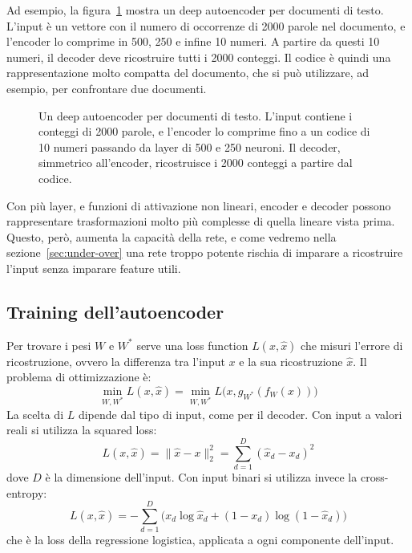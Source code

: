 Ad esempio, la figura~\ref{fig:deep-autoencoder} mostra un deep autoencoder per documenti di testo. L'input è un vettore con il numero di occorrenze di 2000 parole nel documento, e l'encoder lo comprime in 500, 250 e infine 10 numeri. A partire da questi 10 numeri, il decoder deve ricostruire tutti i 2000 conteggi. Il codice è quindi una rappresentazione molto compatta del documento, che si può utilizzare, ad esempio, per confrontare due documenti.

\begin{figure}[htbp]
\centering
{}
\caption{Un deep autoencoder per documenti di testo. L'input contiene i conteggi di 2000 parole, e l'encoder lo comprime fino a un codice di 10 numeri passando da layer di 500 e 250 neuroni. Il decoder, simmetrico all'encoder, ricostruisce i 2000 conteggi a partire dal codice.}
\label{fig:deep-autoencoder}
\end{figure}

Con più layer, e funzioni di attivazione non lineari, encoder e decoder possono rappresentare trasformazioni molto più complesse di quella lineare vista prima. Questo, però, aumenta la capacità della rete, e come vedremo nella sezione~\ref{sec:under-over} una rete troppo potente rischia di imparare a ricostruire l'input senza imparare feature utili.

\subsection{Training dell'autoencoder}\label{sec:autoencoder-training}
Per trovare i pesi $W$ e $W^*$ serve una loss function $L(x, \hat{x})$ che misuri l'errore di ricostruzione, ovvero la differenza tra l'input $x$ e la sua ricostruzione $\hat{x}$. Il problema di ottimizzazione è:
\[
    \min_{W, W^*} L(x, \hat{x}) = \min_{W, W^*} L\big(x, g_{W^*}(f_W(x))\big)
\]
La scelta di $L$ dipende dal tipo di input, come per il decoder. Con input a valori reali si utilizza la squared loss:
\[
    L(x, \hat{x}) = \|\hat{x} - x\|_2^2 = \sum_{d=1}^{D} (\hat{x}_d - x_d)^2
\]
dove $D$ è la dimensione dell'input. Con input binari si utilizza invece la cross-entropy:
\[
    L(x, \hat{x}) = -\sum_{d=1}^{D} \big( x_d \log \hat{x}_d + (1 - x_d) \log(1 - \hat{x}_d) \big)
\]
che è la loss della regressione logistica, applicata a ogni componente dell'input.


